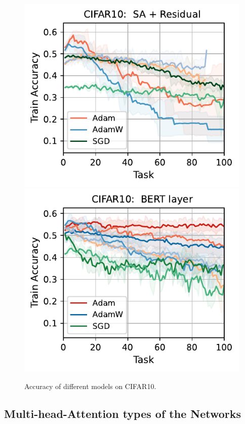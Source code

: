 \begin{figure}[t]
{        \includegraphics[width=\textwidth]{figs/Accuracy/image/attention_residual/cifar10_40.pdf}
        \includegraphics[width=\textwidth]{figs/Accuracy/image/bert_layer/cifar10_40.pdf}
    }
    \caption{Accuracy of different models on CIFAR10.}
    \label{fig:image_models}
\end{figure}



\subsection{Multi-head-Attention types of the Networks}

